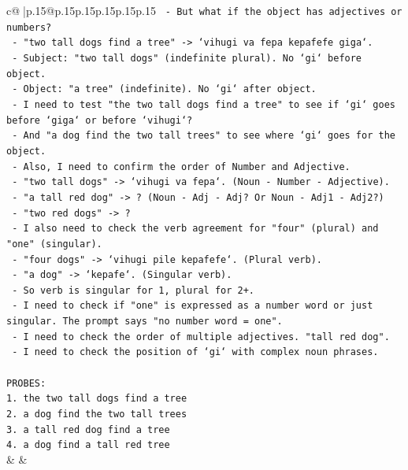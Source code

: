 \documentclass{article}
\begin{document}
{\begin{supertabular}{c@{$\;$}|p{.15\linewidth}@{}p{.15\linewidth}p{.15\linewidth}p{.15\linewidth}p{.15\linewidth}p{.15\linewidth}}
{{{\texttt{                  {-} But what if the object has adjectives or numbers?} \\
\texttt{                  {-} "two tall dogs find a tree" {-}> `vihugi va fepa kepafefe giga`.} \\
\texttt{                    {-} Subject: "two tall dogs" (indefinite plural). No `gi` before object.} \\
\texttt{                    {-} Object: "a tree" (indefinite). No `gi` after object.} \\
\texttt{                  {-} I need to test "the two tall dogs find a tree" to see if `gi` goes before `giga` or before `vihugi`?} \\
\texttt{                  {-} And "a dog find the two tall trees" to see where `gi` goes for the object.} \\
\texttt{                  {-} Also, I need to confirm the order of Number and Adjective.} \\
\texttt{                    {-} "two tall dogs" {-}> `vihugi va fepa`. (Noun {-} Number {-} Adjective).} \\
\texttt{                    {-} "a tall red dog" {-}> ? (Noun {-} Adj {-} Adj? Or Noun {-} Adj1 {-} Adj2?)} \\
\texttt{                    {-} "two red dogs" {-}> ?} \\
\texttt{                  {-} I also need to check the verb agreement for "four" (plural) and "one" (singular).} \\
\texttt{                    {-} "four dogs" {-}> `vihugi pile kepafefe`. (Plural verb).} \\
\texttt{                    {-} "a dog" {-}> `kepafe`. (Singular verb).} \\
\texttt{                    {-} So verb is singular for 1, plural for 2+.} \\
\texttt{                  {-} I need to check if "one" is expressed as a number word or just singular. The prompt says "no number word = one".} \\
\texttt{                  {-} I need to check the order of multiple adjectives. "tall red dog".} \\
\texttt{                  {-} I need to check the position of `gi` with complex noun phrases.} \\
\\ 
\texttt{PROBES:} \\
\texttt{1. the two tall dogs find a tree} \\
\texttt{2. a dog find the two tall trees} \\
\texttt{3. a tall red dog find a tree} \\
\texttt{4. a dog find a tall red tree} \\
            }
        }
    }
    & & \\ \\


\end{supertabular}}
\end{document}
